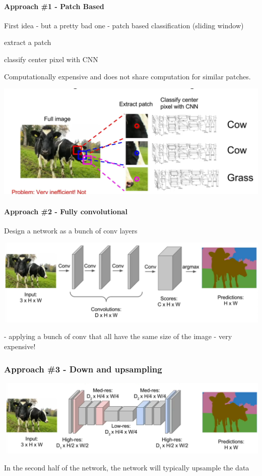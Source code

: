\paragraph{Approach \#1 - Patch Based}

First idea - but a pretty bad one - patch based classification (sliding window)

extract a patch

classify center pixel with CNN

Computationally expensive and does not share computation for similar patches.

\includegraphics[width=0.5\columnwidth]{fei_fei_li/lecture_11/patch_based.png}

\paragraph{Approach \#2 - Fully convolutional}

Design a network as a bunch of conv layers

\includegraphics[width=0.5\columnwidth]{fei_fei_li/lecture_11/fully_convolutional.png}

- applying a bunch of conv that all have the same size of the image - very expensive!

\subsubsection{Approach \#3 - Down and upsampling}

\includegraphics[width=0.5\columnwidth]{fei_fei_li/lecture_11/down_up_sampling.png}

In the second half of the network, the network will typically upsample the data

